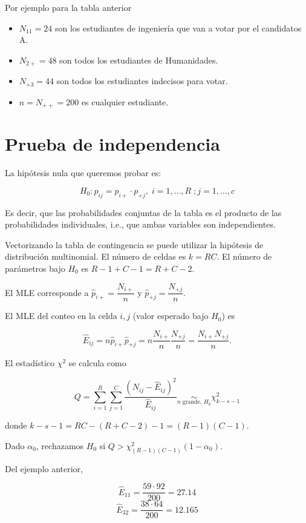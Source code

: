 \documentclass[
  12pt,
]{book}
\providecommand{\tightlist}{%
  \setlength{\itemsep}{0pt}\setlength{\parskip}{0pt}}
\begin{document}
Por ejemplo para la tabla anterior

\begin{itemize}
\tightlist
\item
  \(N_{11} = 24\) son los estudiantes de ingeniería que van a votar por el
  candidatos A.
\item
  \(N_{2+} = 48\) son todos los estudiantes de Humanidades.
\item
  \(N_{+3} = 44\) son todos los estudiantes indecisos para votar.
\item
  \(n = N_{++} = 200\) es cualquier estudiante.
\end{itemize}

\hypertarget{prueba-de-independencia}{%
\section{Prueba de independencia}\label{prueba-de-independencia}}

La hipótesis nula que queremos probar es:

\[H_0: p_{ij} = p_{i+}\cdot p_{+j},\;i=1,\dots,R \; ;j=1,\dots, c\]

Es decir, que las probabilidades conjuntas de la tabla es el producto de las
probabilidades individuales, i.e., que ambas variables son independientes.

Vectorizando la tabla de contingencia se puede utilizar la hipótesis de
distribución multinomial. El número de celdas es \(k=RC\). El número de parámetros
bajo \(H_0\) es \(R-1+C-1 = R+C-2\).

El MLE corresponde a \(\hat p_{i+} = \dfrac{N_{i+}}{n}\) y
\(\hat p_{+j} = \dfrac{N_{+j}}{n}\).

El MLE del conteo en la celda \(i,j\) (valor esperado bajo \(H_0\)) es

\[\hat E_{ij} = n\hat p_{i+} \hat p_{+j} = n\dfrac{N_{i+}}{n}\dfrac{N_{+j}}{n} =
\dfrac{N_{i+}N_{+j}}{n}.\]

El estadístico \(\chi^2\) se calcula como

\[Q = \sum_{i=1}^R\sum_{j=1}^C \dfrac{(N_{ij}-\hat E_{ij})^2}{\hat E_{ij}}
\underset{n\text{ grande, }H_0}{\sim} \chi^2_{k-s-1}\]

donde \(k-s-1 = RC-(R+C-2)-1 = (R-1)(C-1).\)

Dado \(\alpha_0\), rechazamos \(H_0\) si \(Q>\chi^2_{(R-1)(C-1)}(1-\alpha_0)\).

Del ejemplo anterior,

\[\hat E_{11} = \dfrac{59\cdot92}{200} = 27.14\]
\[\hat E_{32} = \dfrac{38\cdot64}{200} = 12.165\]
\end{document}
